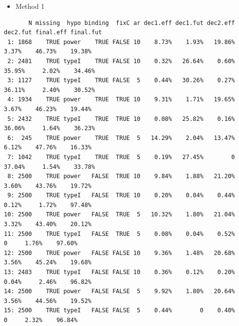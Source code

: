\documentclass[12pt]{article}
\begin{document}
\begin{itemize}
\item Method 1
\end{itemize}
\begin{verbatim}
       N missing  hypo binding  fixC ar dec1.eff dec1.fut dec2.eff dec2.fut final.eff final.fut
 1: 1868    TRUE power    TRUE FALSE 10    8.73%    1.93%   19.86%    3.37%    46.73%    19.38%
 2: 2481    TRUE typeI    TRUE FALSE 10    0.32%   26.64%    0.60%   35.95%     2.02%    34.46%
 3: 1127    TRUE typeI    TRUE FALSE  5    0.44%   30.26%    0.27%   36.11%     2.40%    30.52%
 4: 1934    TRUE power    TRUE  TRUE 10    9.31%    1.71%   19.65%    3.67%    46.23%    19.44%
 5: 2432    TRUE typeI    TRUE  TRUE 10    0.08%   25.82%    0.16%   36.06%     1.64%    36.23%
 6:  245    TRUE power    TRUE  TRUE  5   14.29%    2.04%   13.47%    6.12%    47.76%    16.33%
 7: 1042    TRUE typeI    TRUE  TRUE  5    0.19%   27.45%        0   37.04%     1.54%    33.78%
 8: 2500    TRUE power   FALSE  TRUE 10    9.84%    1.88%   21.20%    3.60%    43.76%    19.72%
 9: 2500    TRUE typeI   FALSE  TRUE 10    0.20%    0.04%    0.44%    0.12%     1.72%    97.48%
10: 2500    TRUE power   FALSE  TRUE  5   10.32%    1.80%   21.04%    3.32%    43.40%    20.12%
11: 2500    TRUE typeI   FALSE  TRUE  5    0.08%    0.04%    0.52%        0     1.76%    97.60%
12: 2500    TRUE power   FALSE FALSE 10    9.36%    1.48%   20.68%    3.56%    45.24%    19.68%
13: 2483    TRUE typeI   FALSE FALSE 10    0.36%    0.12%    0.20%    0.04%     2.46%    96.82%
14: 2500    TRUE power   FALSE FALSE  5    9.92%    1.80%   20.64%    3.56%    44.56%    19.52%
15: 2500    TRUE typeI   FALSE FALSE  5    0.44%        0    0.40%        0     2.32%    96.84%
\end{verbatim}
\end{document}
